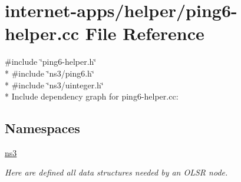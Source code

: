 \hypertarget{ping6-helper_8cc}{}\section{internet-\/apps/helper/ping6-\/helper.cc File Reference}
\label{ping6-helper_8cc}
{\ttfamily \#include \char`\"{}ping6-\/helper.\+h\char`\"{}}\\*
{\ttfamily \#include \char`\"{}ns3/ping6.\+h\char`\"{}}\\*
{\ttfamily \#include \char`\"{}ns3/uinteger.\+h\char`\"{}}\\*
Include dependency graph for ping6-\/helper.cc\+:
\subsection*{Namespaces}
\begin{DoxyCompactItemize}
\item 
 \hyperlink{namespacens3}{ns3}
\begin{DoxyCompactList}\small\item\em Here are defined all data structures needed by an O\+L\+SR node. \end{DoxyCompactList}\end{DoxyCompactItemize}
